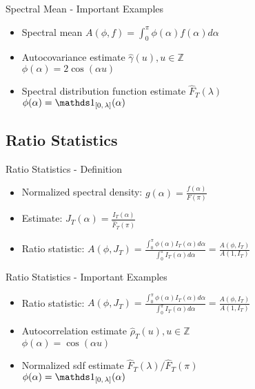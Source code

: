 \begin{frame}{Spectral Mean - Important Examples}
\begin{itemize}

\item Spectral mean $A(\phi, f) = \int_0^\pi \phi(\alpha)f(\alpha)d\alpha$

\item Autocovariance estimate $\hat{\gamma}(u), u \in \mathbb{Z}$\\
$\phi(\alpha) = 2\cos(\alpha u)$

\item Spectral distribution function estimate $\hat{F}_T(\lambda)$\\
$\phi(\alpha) = \on{[0,\lambda]}(\alpha)$

\end{itemize}
\end{frame}



\subsection{Ratio Statistics}
\begin{frame}{Ratio Statistics - Definition}
\begin{itemize}

\item Normalized spectral density: $g(\alpha)=\frac{f(\alpha)}{F(\pi)}$

\item Estimate: $J_T(\alpha)=\frac{I_T(\alpha)}{\hat{F}_T(\pi)}$

\item Ratio statistic: $A(\phi,J_T)=\frac{\int_0^\pi \phi(\alpha)I_T(\alpha)d\alpha}{\int_0^\pi I_T(\alpha)d\alpha} = \frac{A(\phi,I_T)}{A(1,I_T)}$

\end{itemize}
\end{frame}



\begin{frame}{Ratio Statistics - Important Examples}
\begin{itemize}
\item Ratio statistic: $A(\phi,J_T)=\frac{\int_0^\pi \phi(\alpha)I_T(\alpha)d\alpha}{\int_0^\pi I_T(\alpha)d\alpha} = \frac{A(\phi,I_T)}{A(1,I_T)}$


\item Autocorrelation estimate $\hat{\rho}_T(u), u \in \mathbb{Z}$\\
$\phi(\alpha)=\cos(\alpha u)$

\item Normalized sdf estimate $\hat{F}_T(\lambda) / \hat{F}_T(\pi)$\\
$\phi(\alpha) = \on{[0,\lambda]}(\alpha)$

\end{itemize}
\end{frame}



